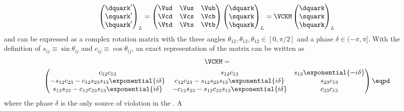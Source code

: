 \begin{equation}
  \begin{pmatrix}
    \dquark^\prime \\
    \squark^\prime \\
    \bquark^\prime \\
  \end{pmatrix}_L
  = 
  \begin{pmatrix}
    \Vud & \Vus & \Vub \\
    \Vcd & \Vcs & \Vcb \\
    \Vtd & \Vts & \Vtb \\
  \end{pmatrix}
  \begin{pmatrix}
    \dquark \\
    \squark \\
    \bquark \\
  \end{pmatrix}_L
  = \VCKM
  \begin{pmatrix}
    \dquark \\
    \squark \\
    \bquark \\
  \end{pmatrix}_L
\end{equation}
%
and can be expressed as a complex rotation matrix with the three angles
$\theta_{12}, \theta_{12}, \theta_{12} \in {[0, \pi/2]}$ and a phase $\delta \in
{(-\pi, \pi]}$. With the definition of $s_{ij} \equiv \sin \theta_{ij}$ and
$c_{ij} \equiv \cos \theta_{ij}$, an exact representation of the \CKM matrix can
be written as
%
\begin{multline}
  \VCKM = \\
  \begin{pmatrix}
    c_{12} c_{13}                                                   & s_{12} c_{13}                                                 & s_{13} \exponential{-i\delta} \\
    -s_{12} c_{23} - c_{12} s_{23} s_{13} \exponential{i\delta}     & c_{12} c_{23} - s_{12} s_{23} s_{13} \exponential{i\delta}    & s_{23} c_{13}                 \\
    s_{12} s_{23} - c_{12} c_{23} s_{13} \exponential{i\delta}      & -c_{12} s_{23} - s_{12} c_{23} s_{13} \exponential{i\delta}   & c_{23} c_{13}                 \\
  \end{pmatrix}\eqpd
\end{multline}
%
where the phase $\delta$ is the only source of \CP violation in the \SM. A
